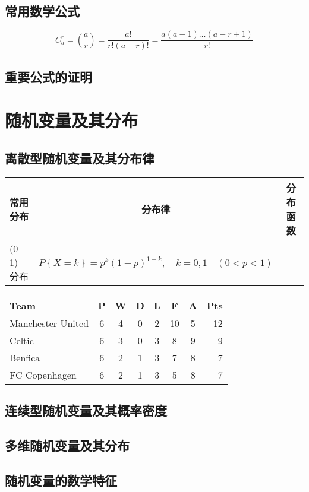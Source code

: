 \documentclass[11pt]{book}
\newcounter{#2}
\newcounter{#2}[#1]
\numberwithin{#2}{#1}
\begin{document}
	\section{常用数学公式}
		\begin{equation}
			C_a ^r =\binom{a}{r}=\frac{a!}{r!(a-r)!}=\frac{a(a-1)\dots (a-r+1)}{r!}
		\end{equation}
	\section{重要公式的证明}
	\chapter{随机变量及其分布}
	\section{离散型随机变量及其分布律}
	\begin{tabular}{|l|c|c|}
		\hline
		常用分布 & 分布律 & 分布函数 \\
		\hline
		(0-1) 分布 & $
		P\left\lbrace X=k\right\rbrace =p^k\left( 1-p\right) ^{1-k},\hspace{1em}k=0,1 \hspace{1em}\left( 0<p<1\right) 
		$ & \\
		\hline
	\end{tabular}

\begin{tabular}{l*{6}{c}r}
	Team              & P & W & D & L & F  & A & Pts \\
	\hline
	Manchester United & 6 & 4 & 0 & 2 & 10 & 5 & 12  \\
	Celtic            & 6 & 3 & 0 & 3 &  8 & 9 &  9  \\
	Benfica           & 6 & 2 & 1 & 3 &  7 & 8 &  7  \\
	FC Copenhagen     & 6 & 2 & 1 & 3 &  5 & 8 &  7  \\
\end{tabular}
 



	\section{连续型随机变量及其概率密度}
	\section{多维随机变量及其分布}
	\section{随机变量的数学特征}
\end{document}
